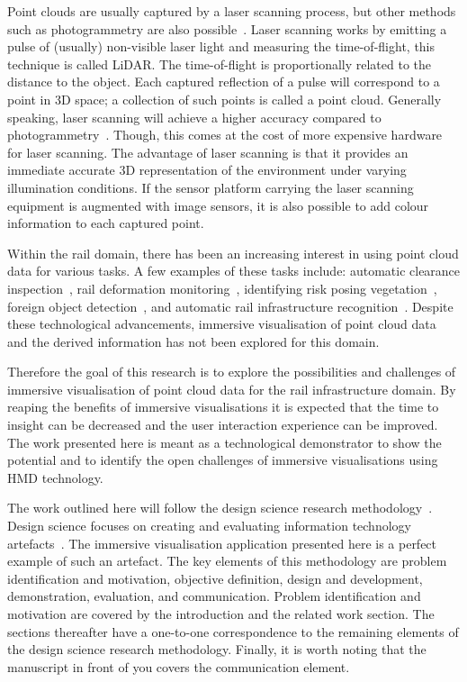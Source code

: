 Point clouds are usually captured by a laser scanning process, but other methods such as photogrammetry are also possible~\cite{Westoby12}. Laser scanning works by emitting a pulse of (usually) non-visible laser light and measuring the time-of-flight, this technique is called LiDAR. The time-of-flight is proportionally related to the distance to the object. Each captured reflection of a pulse will correspond to a point in 3D space; a collection of such points is called a point cloud. Generally speaking, laser scanning will achieve a higher accuracy compared to photogrammetry~\cite{Kalvoda20}. Though, this comes at the cost of more expensive hardware for laser scanning. The advantage of laser scanning is that it provides an immediate accurate 3D representation of the environment under varying illumination conditions. If the sensor platform carrying the laser scanning equipment is augmented with image sensors, it is also possible to add colour information to each captured point.

Within the rail domain, there has been an increasing interest in using point cloud data for various tasks. A few examples of these tasks include: automatic clearance inspection~\cite{ZhongDan20}, rail deformation monitoring~\cite{Karunathilake20}, identifying risk posing vegetation~\cite{Hoerbinger20}, foreign object detection~\cite{QuJinyan23}, and automatic rail infrastructure recognition~\cite{arastounia2015automated}. Despite these technological advancements, immersive visualisation of point cloud data and the derived information has not been explored for this domain.

Therefore the goal of this research is to explore the possibilities and challenges of immersive visualisation of point cloud data for the rail infrastructure domain. By reaping the benefits of immersive visualisations it is expected that the time to insight can be decreased and the user interaction experience can be improved. The work presented here is meant as a technological demonstrator to show the potential and to identify the open challenges of immersive visualisations using HMD technology. 

The work outlined here will follow the design science research methodology~\cite{peffers.07}. Design science focuses on creating and evaluating information technology artefacts~\cite{hevner.04}. The immersive visualisation application presented here is a perfect example of such an artefact. The key elements of this methodology are problem identification and motivation, objective definition, design and development, demonstration, evaluation, and communication. Problem identification and motivation are covered by the introduction and the related work section. The sections thereafter have a one-to-one correspondence to the remaining elements of the design science research methodology. Finally, it is worth noting that the manuscript in front of you covers the communication element.

